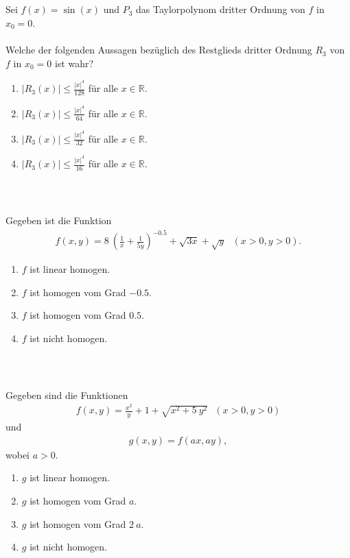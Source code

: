 \subsection*{}
Sei $ f(x) = \sin(x) $ und $ P_3  $ das Taylorpolynom  dritter Ordnung von $ f $ in $ x_0 = 0 $.\\
\\
Welche der folgenden Aussagen bezüglich des Restglieds dritter Ordnung $ R_3 $ von $ f  $ in $ x_0 = 0 $ ist wahr?
\renewcommand{\labelenumi}{(\alph{enumi})}
\begin{enumerate}
\item 
$ |R_3(x)| \leq \frac{|x|^4}{128} $ für alle $ x \in \mathbb{R} $.
\item
$ |R_3(x)| \leq \frac{|x|^4}{64} $ für alle $ x \in \mathbb{R} $.
\item
$ |R_3(x)| \leq \frac{|x|^4}{32} $ für alle $ x \in \mathbb{R} $.
\item
$ |R_3(x)| \leq \frac{|x|^4}{16} $ für alle $ x \in \mathbb{R} $.
\end{enumerate}
\ \\
\subsection*{}
Gegeben ist die Funktion
\begin{align*}
f(x,y) = 8 \ \left( \frac{1}{x} + \frac{1}{5  y} \right)^{-0.5}
+ \sqrt{3  x} + \sqrt{y} \ \ \
(x > 0 , y > 0).
\end{align*}
\renewcommand{\labelenumi}{(\alph{enumi})}
\begin{enumerate}
\item 
$ f $ ist linear homogen.
\item
$ f $ ist homogen vom Grad $ -0.5 $.
\item
$ f $ ist homogen vom Grad $ 0.5 $.
\item
$ f $ ist nicht homogen.
\end{enumerate}
\ \\
\subsection*{}
Gegeben sind die Funktionen
\begin{align*}
f(x,y) =  \frac{x^2}{y} + 1 + \sqrt{x^2 + 5 \ y^2} \ \ \
(x > 0 , y > 0)
\end{align*}
und
\begin{align*}
g(x,y) = f( a  x, a  y),
\end{align*}
wobei $ a >0 $.
\renewcommand{\labelenumi}{(\alph{enumi})}
\begin{enumerate}
\item 
$ g $ ist linear homogen.
\item
$ g $ ist homogen vom Grad $ a $.
\item
$ g $ ist homogen vom Grad $ 2 \  a $.
\item
$ g $ ist nicht homogen.
\end{enumerate}
\ \\
